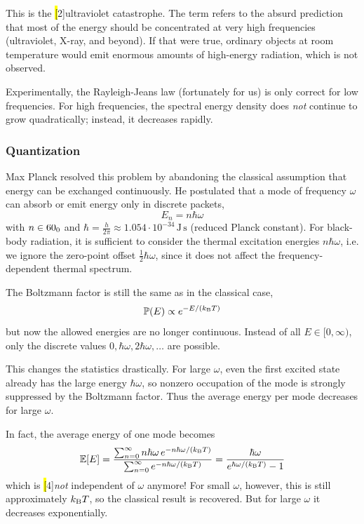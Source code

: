 This is the \hl[2]{ultraviolet catastrophe}.
The term refers to the absurd prediction that most of the energy should be concentrated at very high frequencies (ultraviolet, X-ray, and beyond).
If that were true, ordinary objects at room temperature would emit enormous amounts of high-energy radiation, which is not observed.

Experimentally, the Rayleigh-Jeans law (fortunately for us) is only correct for low frequencies.
For high frequencies, the spectral energy density does \emph{not} continue to grow quadratically; instead, it decreases rapidly.




\subsubsection{Quantization}

Max Planck resolved this problem by abandoning the classical assumption that energy can be exchanged continuously.
He postulated that a mode of frequency \(\omega\) can absorb or emit energy only in discrete packets,
\[
E_n = n \hbar \omega
\]
with \(n \in 60_0\) and
\(
\hbar 
=
\frac{h}{2\pi}
\approx 1.054 \cdot 10^{-34}\,\mathrm{J\,s}
\)
(reduced Planck constant).
For black-body radiation, it is sufficient to consider the thermal excitation energies \(n\hbar\omega\), i.e. we ignore the zero-point offset \(\frac12\hbar\omega\), since it does not affect the frequency-dependent thermal spectrum.

The Boltzmann factor is still the same as in the classical case,
\[
\operatorname{\mathbb{P}}(E) \propto e^{-E/(k_{\mathrm{B}} T)}
\]
but now the allowed energies are no longer continuous.
Instead of all \(E \in [0,\infty)\), only the discrete values
\(
0,\hbar\omega,2\hbar\omega,\dots
\)
are possible.

This changes the statistics drastically.
For large \(\omega\), even the first excited state already has the large energy \(\hbar\omega\), 
so nonzero occupation of the mode is strongly suppressed by the Boltzmann factor.
Thus the average energy per mode decreases for large \(\omega\).

In fact, the average energy of one mode becomes
\[
\operatorname{\mathbb{E}}[E]
=
\frac{\sum_{n=0}^{\infty} n\hbar\omega\,e^{-n\hbar\omega/(k_{\mathrm{B}} T)}}{\sum_{n=0}^{\infty}e^{-n\hbar\omega/(k_{\mathrm{B}} T)}}
=
\frac{\hbar\omega}{e^{\hbar\omega/(k_{\mathrm{B}} T)}-1}
\]
which is \hl[4]{\emph{not} independent of \(\omega\)} anymore!
For small \(\omega\), however, this is still approximately \(k_{\mathrm{B}} T\), so the classical result is recovered.
But for large \(\omega\) it decreases exponentially.

